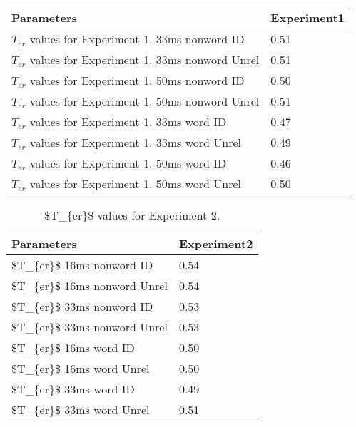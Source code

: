 \documentclass[
  english,
  man]{apa6}
\begin{document}
\begin{appendix}
\begin{table}[tbp]
\begin{center}
\begin{threeparttable}
\begin{tabular}{ll}
\toprule
Parameters & \multicolumn{1}{c}{Experiment1}\\
\midrule
$T_{er}$ values for Experiment 1.  33ms nonword ID & 0.51\\
$T_{er}$ values for Experiment 1. 33ms nonword Unrel & 0.51\\
$T_{er}$ values for Experiment 1.  50ms nonword ID & 0.50\\
$T_{er}$ values for Experiment 1. 50ms nonword Unrel & 0.51\\
$T_{er}$ values for Experiment 1.  33ms word ID & 0.47\\
$T_{er}$ values for Experiment 1. 33ms word Unrel & 0.49\\
$T_{er}$ values for Experiment 1.  50ms word ID & 0.46\\
$T_{er}$ values for Experiment 1. 50ms word Unrel & 0.50\\
\bottomrule
\end{tabular}

\end{threeparttable}
\end{center}

\end{table}

\begin{table}[tbp]

\begin{center}
\begin{threeparttable}

\caption{\label{tab:appendix_table_3} \$T\_\{er\}\$ values for Experiment 2.}

\begin{tabular}{ll}
\toprule
Parameters & \multicolumn{1}{c}{Experiment2}\\
\midrule
\$T\_\{er\}\$ 16ms nonword ID & 0.54\\
\$T\_\{er\}\$ 16ms nonword Unrel & 0.54\\
\$T\_\{er\}\$ 33ms nonword ID & 0.53\\
\$T\_\{er\}\$ 33ms nonword Unrel & 0.53\\
\$T\_\{er\}\$ 16ms word ID & 0.50\\
\$T\_\{er\}\$ 16ms word Unrel & 0.50\\
\$T\_\{er\}\$ 33ms word ID & 0.49\\
\$T\_\{er\}\$ 33ms word Unrel & 0.51\\
\bottomrule
\end{tabular}

\end{threeparttable}
\end{center}


\end{table}
\end{appendix}
\end{document}
